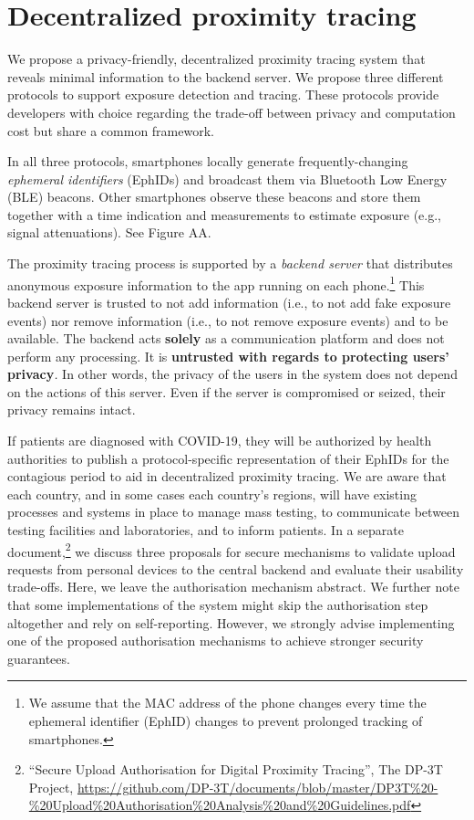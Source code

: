 \documentclass{article}
\begin{document}
\hypertarget{decentralized-proximity-tracing}{%
\section{Decentralized proximity
tracing}\label{decentralized-proximity-tracing}}

We propose a privacy-friendly, decentralized proximity tracing system
that reveals minimal information to the backend server. We propose three
different protocols to support exposure detection and tracing. These
protocols provide developers with choice regarding the trade-off between
privacy and computation cost but share a common framework.

In all three protocols, smartphones locally generate frequently-changing
\emph{ephemeral identifiers} (EphIDs) and broadcast them via Bluetooth
Low Energy (BLE) beacons. Other smartphones observe these beacons and
store them together with a time indication and measurements to estimate
exposure (e.g., signal attenuations). See Figure AA.

The proximity tracing process is supported by a \emph{backend server}
that distributes anonymous exposure information to the app running on
each phone.\footnote{We assume that the MAC address of the phone changes
  every time the ephemeral identifier (EphID) changes to prevent
  prolonged tracking of smartphones.} This backend server is trusted to
not add information (i.e., to not add fake exposure events) nor remove
information (i.e., to not remove exposure events) and to be available.
The backend acts \textbf{solely} as a communication platform and does
not perform any processing. It is \textbf{untrusted with regards to
protecting users' privacy}\emph{.} In other words, the privacy of the
users in the system does not depend on the actions of this server. Even
if the server is compromised or seized, their privacy remains intact.

If patients are diagnosed with COVID-19, they will be authorized by
health authorities to publish a protocol-specific representation of
their EphIDs for the contagious period to aid in decentralized proximity
tracing. We are aware that each country, and in some cases each
country's regions, will have existing processes and systems in place to
manage mass testing, to communicate between testing facilities and
laboratories, and to inform patients. In a separate document,\footnote{``Secure
  Upload Authorisation for Digital Proximity Tracing'', The DP-3T
  Project,
  \href{https://github.com/DP-3T/documents/blob/master/DP3T\%20-\%20Upload\%20Authorisation\%20Analysis\%20and\%20Guidelines.pdf}{{https://github.com/DP-3T/documents/blob/master/DP3T\%20-\%20Upload\%20Authorisation\%20Analysis\%20and\%20Guidelines.pdf}}}
we discuss three proposals for secure mechanisms to validate upload
requests from personal devices to the central backend and evaluate their
usability trade-offs. Here, we leave the authorisation mechanism
abstract. We further note that some implementations of the system might
skip the authorisation step altogether and rely on self-reporting.
However, we strongly advise implementing one of the proposed
authorisation mechanisms to achieve stronger security guarantees.
\end{document}
